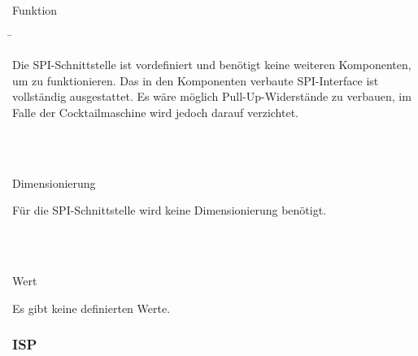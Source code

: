 \begin{tabbing}
\parbox[t]{.25\textwidth}{

Funktion

} \=\parbox[t]{.75\textwidth}{

Die SPI-Schnittstelle ist vordefiniert und benötigt keine weiteren Komponenten, um zu funktionieren. Das in den Komponenten verbaute SPI-Interface ist vollständig ausgestattet. Es wäre möglich Pull-Up-Widerstände zu verbauen, im Falle der Cocktailmaschine wird jedoch darauf verzichtet.

}\\
\\
\parbox[t]{.25\textwidth}{

Dimensionierung

} \>\parbox[t]{.75\textwidth}{

Für die SPI-Schnittstelle wird keine Dimensionierung benötigt.

}\\
\\
\parbox[t]{.25\textwidth}{

Wert

} \>\parbox[t]{.75\textwidth}{

Es gibt keine definierten Werte.\\




}
\end{tabbing}

\subsubsection{ISP}\label{subsubsec:ISP_Mikrocontroller}

